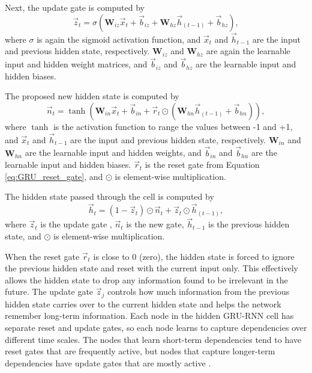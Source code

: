Next, the update gate is computed by
\begin{equation} \label{eq:GRU_update_gate}
	\vec{z}_{t} = \sigma\left(\textbf{W}_{iz} \vec{x}_{t} + \vec{b}_{iz} + \textbf{W}_{hz} \vec{h}_{\left(t-1\right)} + \vec{b}_{hz}\right),
\end{equation}
where $\sigma$ is again the sigmoid activation function, and $\vec{x}_{t}$ and $\vec{h}_{t-1}$ are the input and previous hidden state, respectively. $\textbf{W}_{iz}$ and $\textbf{W}_{hz}$ are again the learnable input and hidden weight matrices, and $\vec{b}_{iz}$ and $\vec{b}_{hz}$ are the learnable input and hidden biases.

The proposed new hidden state is computed by
\begin{equation} \label{eq:GRU_new_gate}
		\vec{n}_{t} = \tanh\left(\textbf{W}_{in} \vec{x}_{t} + \vec{b}_{in} + \vec{r}_{t} \odot \left(\textbf{W}_{hn} \vec{h}_{\left(t-1\right)} + \vec{b}_{hn}\right)\right),
\end{equation}
where $\tanh$ is the activation function to range the values between -1 and +1, and $\vec{x}_{t}$ and $\vec{h}_{t-1}$ are the input and previous hidden state, respectively. $\textbf{W}_{in}$ and $\textbf{W}_{hn}$ are the learnable input and hidden weights, and $\vec{b}_{in}$ and $\vec{b}_{hn}$ are the learnable input and hidden biases. $\vec{r}_{t}$ is the reset gate from Equation \ref{eq:GRU_reset_gate}, and $\odot$ is element-wise multiplication.

The hidden state passed through the cell is computed by
\begin{equation} \label{eq:GRU_new_hidden_state}
	\vec{h}_{t} = \left(1 - \vec{z}_{t}\right) \odot \vec{n}_{t} + \vec{z}_{t} \odot \vec{h}_{\left(t-1\right)},
\end{equation}
where $\vec{z}_{t}$ is the update gate , $\vec{n}_{t}$ is the new gate, $\vec{h}_{t-1}$ is the previous hidden state, and $\odot$ is element-wise multiplication.

When the reset gate $\vec{r}_{t}$ is close to 0 (zero), the hidden state is forced to ignore the previous hidden state and reset with the current input only. This effectively allows the hidden state to drop any information found to be irrelevant in the future. The update gate $\vec{z}_{j}$ controls how much information from the previous hidden state carries over to the current hidden state and helps the network remember long-term information. Each node in the hidden \ac{GRU-RNN} cell has separate reset and update gates, so each node learns to capture dependencies over different time scales. The nodes that learn short-term dependencies tend to have reset gates that are frequently active, but nodes that capture longer-term dependencies have update gates that are mostly active \cite{GRU_original}.

